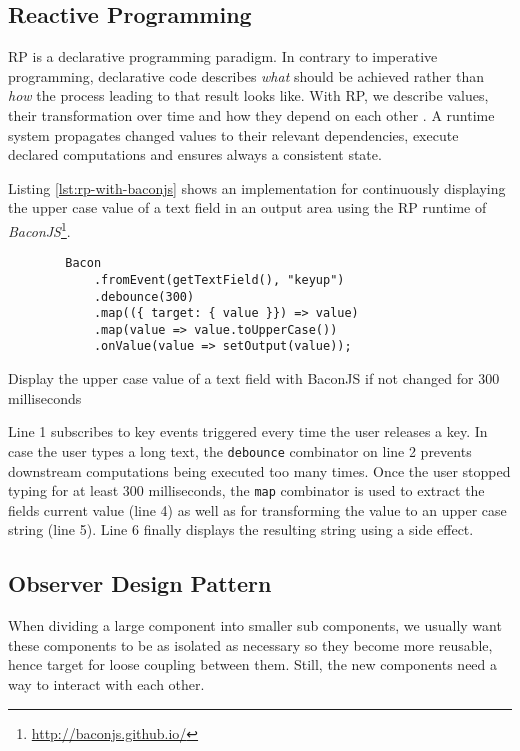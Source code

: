 \documentclass[12pt,a4paper]{article}
\begin{document}
\subsection{Reactive Programming}
RP is a declarative programming paradigm. In contrary to imperative programming, declarative code describes \emph{what} should be achieved rather than \emph{how} the process leading to that result looks like. With RP, we describe values, their transformation over time and how they depend on each other \cite{8354906}. A runtime system propagates changed values to their relevant dependencies, execute declared computations and ensures always a consistent state.

Listing \ref{lst:rp-with-baconjs} shows an implementation for continuously displaying the upper case value of a text field in an output area using the RP runtime of \emph{BaconJS}\footnote{\url{http://baconjs.github.io/}}.

\begin{listing}[H]
	\begin{verbatim}
		Bacon
			.fromEvent(getTextField(), "keyup")
			.debounce(300)
			.map(({ target: { value }}) => value)
			.map(value => value.toUpperCase())
			.onValue(value => setOutput(value));
	\end{verbatim}
	\caption{Display the upper case value of a text field with BaconJS if not changed for 300 milliseconds}
	\label{lst:rp-with-baconjs}
\end{listing}

Line 1 subscribes to key events triggered every time the user releases a key. In case the user types a long text, the \texttt{debounce} combinator on line 2 prevents downstream computations being executed too many times. Once the user stopped typing for at least 300 milliseconds, the \texttt{map} combinator is used to extract the fields current value (line 4) as well as for transforming the value to an upper case string (line 5). Line 6 finally displays the resulting string using a side effect.

\subsection{Observer Design Pattern}
When dividing a large component into smaller sub components, we usually want these components to be as isolated as necessary so they become more reusable, hence target for loose coupling between them. Still, the new components need a way to interact with each other.
\end{document}
